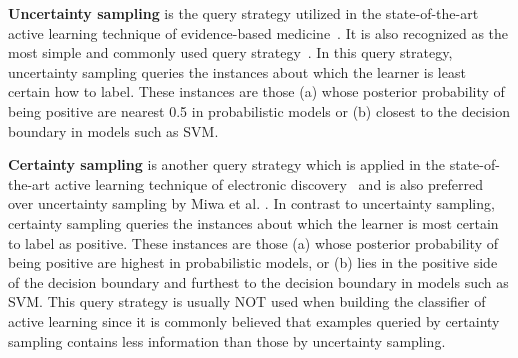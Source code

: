 \documentclass{svjour3}
\theoremstyle{break}
\begin{document}
\textbf{Uncertainty sampling} is the query strategy utilized in the state-of-the-art active learning technique of evidence-based medicine~\cite{wallace2010semi,wallace2010active}. It is also recognized as the most simple and commonly used query strategy~\cite{settles2010active}. In this query strategy, uncertainty sampling queries the instances about which the learner is least certain how to label. These instances are those (a) whose posterior probability of being positive are nearest 0.5 in probabilistic models or (b) closest to the decision boundary in models such as SVM. 

\textbf{Certainty sampling} is another query strategy which is applied in the state-of-the-art active learning technique of electronic discovery~\cite{cormack2014evaluation,cormack2015autonomy} and is also preferred over uncertainty sampling by Miwa et al. \cite{miwa2014reducing}. In contrast to uncertainty sampling, certainty sampling queries the instances about which the learner is most certain to label as positive. These instances are those (a) whose posterior probability of being positive are highest in probabilistic models, or (b) lies in the positive side of the decision boundary and furthest to the decision boundary in models such as SVM. This query strategy is usually NOT used when building the classifier of active learning since it is commonly believed that examples queried by certainty sampling contains less information than those by uncertainty sampling.


\end{document}
